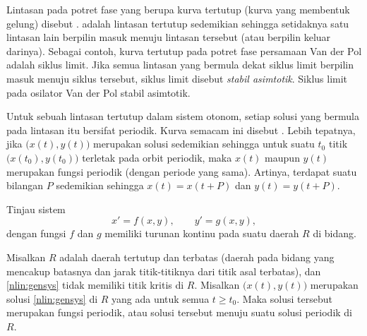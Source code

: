 Lintasan pada potret fase yang berupa kurva tertutup (kurva yang membentuk
gelung) disebut \emph{}.
\emph{} adalah lintasan tertutup sedemikian sehingga
setidaknya satu lintasan lain berpilin masuk menuju lintasan tersebut
(atau berpilin keluar darinya). Sebagai contoh, kurva tertutup pada potret
fase persamaan Van der Pol adalah siklus limit.
Jika semua lintasan yang bermula dekat siklus limit berpilin masuk menuju
siklus tersebut, siklus limit disebut
\emph{stabil asimtotik}.
Siklus limit pada osilator Van der Pol stabil asimtotik.

Untuk sebuah lintasan tertutup dalam sistem otonom, setiap solusi yang
bermula pada lintasan itu bersifat periodik. Kurva semacam ini disebut
\emph{}.
Lebih tepatnya, jika $\bigl(x(t),y(t)\bigr)$ merupakan solusi sedemikian
sehingga untuk suatu $t_0$ titik $\bigl(x(t_0),y(t_0)\bigr)$ terletak pada
orbit periodik, maka $x(t)$ maupun $y(t)$ merupakan fungsi periodik (dengan
periode yang sama). Artinya, terdapat suatu bilangan $P$ sedemikian sehingga
$x(t) = x(t+P)$ dan $y(t) = y(t+P)$.

Tinjau sistem
\begin{equation} \label{nlin:gensys}
x' = f(x,y), \qquad y' = g(x,y) ,
\end{equation}
dengan fungsi $f$ dan $g$ memiliki turunan kontinu pada suatu daerah $R$
di bidang.

\begin{theorem}%
Misalkan $R$ adalah daerah tertutup dan terbatas (daerah pada bidang yang
mencakup batasnya dan jarak titik-titiknya dari titik asal terbatas), dan \eqref{nlin:gensys} tidak memiliki titik kritis di $R$.
Misalkan $\bigl(x(t), y(t)\bigr)$ merupakan solusi
\eqref{nlin:gensys} di $R$ yang ada untuk semua $t \geq t_0$. Maka solusi
tersebut merupakan fungsi periodik, atau solusi tersebut menuju suatu solusi
periodik di $R$.
\end{theorem}

